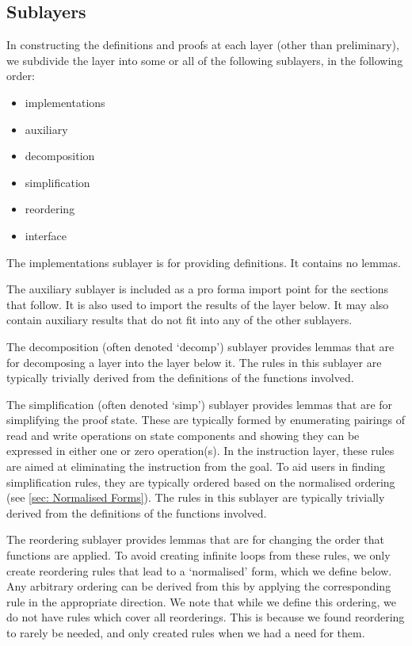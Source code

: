 \documentclass[11pt,a4paper]{article}
\begin{document}
\subsection{Sublayers}
In constructing the definitions and proofs at each layer (other than preliminary), we subdivide the layer into some or all of the following sublayers, in the following order:
\begin{itemize}
  \item implementations
  \item auxiliary
  \item decomposition
  \item simplification
  \item reordering
  \item interface
\end{itemize}

The implementations sublayer is for providing definitions. It contains no lemmas.

The auxiliary sublayer is included as a pro forma import point for the sections that follow. It is also used to import the results of the layer below. It may also contain auxiliary results that do not fit into any of the other sublayers.

The decomposition (often denoted `decomp') sublayer provides lemmas that are for decomposing a layer into the layer below it. The rules in this sublayer are typically trivially derived from the definitions of the functions involved.

The simplification (often denoted `simp') sublayer provides lemmas that are for simplifying the proof state. These are typically formed by enumerating pairings of read and write operations on state components and showing they can be expressed in either one or zero operation(s). In the instruction layer, these rules are aimed at eliminating the instruction from the goal. To aid users in finding simplification rules, they are typically ordered based on the normalised ordering (see \ref{sec: Normalised Forms}). The rules in this sublayer are typically trivially derived from the definitions of the functions involved. 

The reordering sublayer provides lemmas that are for changing the order that functions are applied. To avoid creating infinite loops from these rules, we only create reordering rules that lead to a `normalised' form, which we define below. Any arbitrary ordering can be derived from this by applying the corresponding rule in the appropriate direction. We note that while we define this ordering, we do not have rules which cover all reorderings. This is because we found reordering to rarely be needed, and only created rules when we had a need for them.
\end{document}

